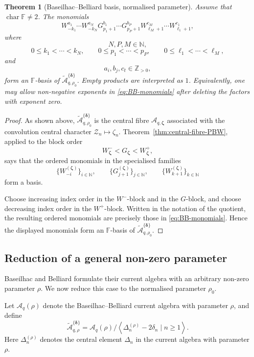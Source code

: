 \documentclass[11pt]{extarticle}
\newtheorem{theorem}{Theorem}[section]
\theoremstyle{definition}
\theoremstyle{remark}
\numberwithin{equation}{section}
\newcommand{\F}{\mathbb F}
\newcommand{\N}{\mathbb N}
\newcommand{\Z}{\mathbb Z}
\newcommand{\Aq}{\mathcal A_q}
\newcommand{\Aqfib}[1]{\mathcal A_{q,#1}}
\newcommand{\BBqquot}[2]{\widetilde{\mathcal A}_{q,#1}^{\{#2\}}}
\newcommand{\Zconv}{\mathcal Z}
\begin{document}
\begin{theorem}[Baseilhac--Belliard basis, normalised parameter]
\label{thm:BB-normalised}
Assume that \(\operatorname{char}\F\neq2\).  The monomials
\begin{equation}
\label{eq:BB-monomials}
 W_{-k_1}^{a_1}\cdots W_{-k_N}^{a_N}
 G_{p_1+1}^{b_1}\cdots G_{p_P+1}^{b_P}
 W_{\ell_M+1}^{c_M}\cdots W_{\ell_1+1}^{c_1},
\end{equation}
where
\[
        N,P,M\in\N,
\]
\[
        0\leq k_1<\cdots<k_N,\qquad
        0\leq p_1<\cdots<p_P,\qquad
        0\leq \ell_1<\cdots<\ell_M,
\]
and
\[
        a_i,b_j,c_t\in\Z_{>0},
\]
form an \(\F\)-basis of
\(\BBqquot{\rho_0}{\boldsymbol\delta}\).  Empty products are interpreted
as \(1\).  Equivalently, one may allow non-negative exponents in
\eqref{eq:BB-monomials} after deleting the factors with exponent zero.
\end{theorem}

\begin{proof}
As shown above,
\(\BBqquot{\rho_0}{\boldsymbol\delta}\) is the central fibre
\(\Aqfib{\boldsymbol\zeta}\) associated with the convolution central character
\(\Zconv_n\mapsto\zeta_n\).  Theorem~\ref{thm:central-fibre-PBW}, applied
to the block order
\[
        W^-_{\boldsymbol\zeta}
        <
        G_{\boldsymbol\zeta}
        <
        W^+_{\boldsymbol\zeta},
\]
says that the ordered monomials in the specialised families
\[
        \{W_{-i}^{(\boldsymbol\zeta)}\}_{i\in\N},
        \qquad
        \{G_{j+1}^{(\boldsymbol\zeta)}\}_{j\in\N},
        \qquad
        \{W_{k+1}^{(\boldsymbol\zeta)}\}_{k\in\N}
\]
form a basis.

Choose increasing index order in the \(W^-\)-block and in the \(G\)-block,
and choose decreasing index order in the \(W^+\)-block.  Written in the
notation of the quotient, the resulting ordered monomials are precisely
those in \eqref{eq:BB-monomials}.  Hence the displayed monomials form an
\(\F\)-basis of
\(\BBqquot{\rho_0}{\boldsymbol\delta}\).
\end{proof}

\subsection{Reduction of a general non-zero parameter}

Baseilhac and Belliard formulate their current algebra with an arbitrary
non-zero parameter \(\rho\).  We now reduce this case to the normalised
parameter \(\rho_0\).

Let \(\Aq(\rho)\) denote the Baseilhac--Belliard current algebra with
parameter \(\rho\), and define
\begin{equation}
\label{eq:BB-quotient-rho}
\BBqquot{\rho}{\boldsymbol\delta}
 =
 \Aq(\rho)/
 \left\langle
        \Delta_n^{(\rho)}-2\delta_n\mid n\geq1
 \right\rangle .
\end{equation}
Here \(\Delta_n^{(\rho)}\) denotes the central element \(\Delta_n\) in the
current algebra with parameter \(\rho\).
\end{document}

